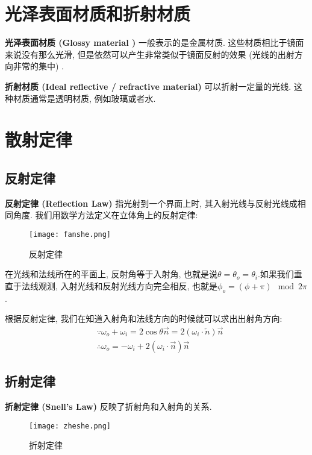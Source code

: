 \documentclass[openany]{progbookcn}
\begin{document}
\section{光泽表面材质和折射材质}

\textbf{光泽表面材质 (Glossy material ) }一般表示的是金属材质. 这些材质相比于镜面来说没有那么光滑, 但是依然可以产生非常类似于镜面反射的效果 (光线的出射方向非常的集中) . 

\textbf{折射材质 (Ideal reflective / refractive material) } 可以折射一定量的光线. 这种材质通常是透明材质, 例如玻璃或者水. 

\section{散射定律}

\subsection{反射定律}

\textbf{反射定律 (Reflection Law) }指光射到一个界面上时, 其入射光线与反射光线成相同角度. 我们用数学方法定义在立体角上的反射定律: 

\begin{figure}[H]
	\centering
	\texttt{[image: fanshe.png]}
	\caption{反射定律}
	\label{fig:fanshed}
\end{figure}

在光线和法线所在的平面上, 反射角等于入射角, 也就是说$\theta=\theta_o=\theta_i$.如果我们垂直于法线观测, 入射光线和反射光线方向完全相反, 也就是$\phi_o=(\phi+\pi)\mod 2\pi$.

根据反射定律, 我们在知道入射角和法线方向的时候就可以求出出射角方向: 
\begin{equation}
	\begin{split}
		&\because \omega_o + \omega_i = 2\cos\theta \overrightarrow{n} = 2(\omega_i\cdot \overleftarrow{n})\overrightarrow{n}\\
		&\therefore \omega_o = -\omega_i + 2(\omega_i\cdot \overrightarrow{n})\overrightarrow{n}
	\end{split}
\end{equation}

\subsection{折射定律}

\textbf{折射定律 (Snell's Law) }反映了折射角和入射角的关系. 

\begin{figure}[H]
	\centering
	\texttt{[image: zheshe.png]}
	\caption{折射定律}
	\label{fig:zheshe}
\end{figure}
\end{document}
